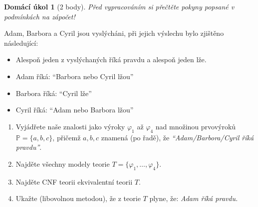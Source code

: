 \documentclass[a4paper]{article}
\theoremstyle{definition}
\newtheorem*{ukol}{Domácí úkol}
\begin{document}
\medskip\begin{ukol}[2 body]
{\it Před vypracováním si přečtěte pokyny popsané v podmínkách na zápočet!}
    
\medskip    
    
Adam, Barbora a Cyril jsou vyslýcháni, při jejich výslechu bylo zjištěno následující:
\begin{itemize}\it
    \item Alespoň jeden z vyslýchaných říká pravdu a alespoň jeden lže.
    \item Adam říká: ``Barbora nebo Cyril lžou''
    \item Barbora říká: ``Cyril lže''
    \item Cyril říká: ``Adam nebo Barbora lžou''
\end{itemize}
\begin{enumerate}
    \item Vyjádřete naše znalosti jako výroky $\varphi_1$ až $\varphi_4$ nad množinou prvovýroků $\mathbb{P}=\{a,b,c\}$, přičemž $a,b,c$ znamená (po řadě), že {\it ``Adam/Barbora/Cyril říká pravdu''}.
    \item Najděte všechny modely teorie $T = \{\varphi_1, \dots, \varphi_4\}$.
    \item Najděte CNF teorii ekvivalentní teorii $T$.
    \item Ukažte (libovolnou metodou), že z teorie $T$ plyne, že: {\it Adam říká pravdu.}
\end{enumerate}    
\end{ukol}
\end{document}
